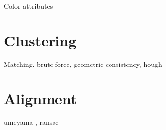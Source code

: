 Color attributes \cite{ColorAttributes}


\section{Clustering}
\label{sec:clustering}

Matching.
brute force, geometric consistency, hough


\section{Alignment}
\label{sec:alignment}



umeyama \cite{umeyama}, ransac

